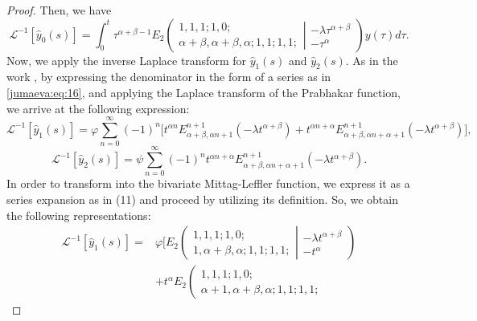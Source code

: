 \documentclass{amsart}
\numberwithin{equation}{section}
\begin{document}
\begin{proof}
Then, we have
\begin{equation}
\mathcal{L}^{-1}[\hat{y}_0(s)]=\int_0^t \tau^{\alpha+\beta-1} E_2\left( 
\begin{array}{c}
1, 1, 1; 1, 0; \\
\alpha+\beta, \alpha+\beta, \alpha ; 1, 1; 1, 1; 
\end{array}
\left| 
\begin{array}{c}
-\lambda \tau^{\alpha+\beta} \\
- \tau^\alpha
\end{array}
\right.
\right) y(\tau) d\tau.\label{jumaeva:eq:18}
\end{equation}
 Now,  we apply the inverse Laplace transform for $\hat{y}_1(s)$ and $\hat{y}_2(s)$. As in the work \cite{jumaeva:ref:25}, by expressing the denominator in the form of a series as in \eqref{jumaeva:eq:16}, and applying the Laplace transform of the Prabhakar function, we arrive at the following expression:
 \begin{equation*}
     \mathcal{L}^{-1}[\hat{y}_1(s)]=\varphi \sum_{n=0}^\infty (-1)^n \bigg[t^{\alpha n}E_{\alpha+\beta,\alpha n+1}^{n+1}(-\lambda t^{\alpha+\beta})+t^{\alpha n+\alpha} E_{\alpha+\beta,\alpha n+\alpha+1}^{n+1}(-\lambda t^{\alpha+\beta})\bigg],
\end{equation*}
 \begin{equation*}
     \mathcal{L}^{-1}[\hat{y}_2(s)]=\psi \sum_{n=0}^\infty (-1)^n t^{\alpha n+\alpha}E_{\alpha+\beta,\alpha n+\alpha +1}^{n+1}(-\lambda t^{\alpha+\beta}).
\end{equation*}
 In order to transform into the bivariate Mittag-Leffler function, we express it as a series expansion as in (11) and proceed by utilizing its definition. So, we obtain the following representations:
 \begin{align}
    \mathcal{L}^{-1}[\hat{y}_1(s)]=&\varphi\bigg[ E_2\left( 
\begin{array}{c}
1, 1, 1; 1, 0; \\
1, \alpha+\beta, \alpha ; 1, 1; 1, 1; 
\end{array}
\left| 
\begin{array}{c}
-\lambda t^{\alpha+\beta} \\
- t^\alpha
\end{array}
\right.
\right)\nonumber \\
&+t^\alpha E_2\left( 
\begin{array}{c}
1, 1, 1; 1, 0; \\
\alpha+1, \alpha+\beta, \alpha ; 1, 1; 1, 1; 
\end{array}

\end{align}
\end{proof}
\end{document}
